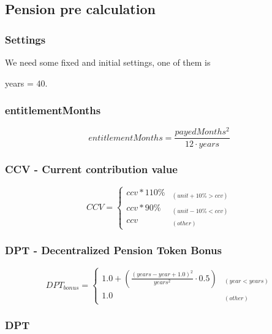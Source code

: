 \newpage

\subsection{Pension pre calculation}

\subsubsection*{Settings}

We need some fixed and initial settings,
one of them is 

years = 40.

\subsubsection*{entitlementMonths}

\begin{equation}
	entitlementMonths = \frac{payedMonths^2}{12 \cdot years}
\end{equation}

\subsubsection*{CCV - Current contribution value}

\begin{equation}
CCV = \begin{cases} 
ccv * 110\% & _{(unit+10\% > ccv)} \\
ccv * 90\% & _{(unit-10\% < ccv)} \\
ccv & _{(other)}
\end{cases}
\end{equation}

\subsubsection*{DPT - Decentralized Pension Token Bonus}

\begin{equation}
DPT_{bonus} = \begin{cases} 
1.0 + (\frac{(years - year + 1.0)^2}
      {years^2} \cdot 0.5) & _{(year < years)} \\
1.0 & _{(other)} 
\end{cases}
\end{equation}


\subsubsection*{DPT}

